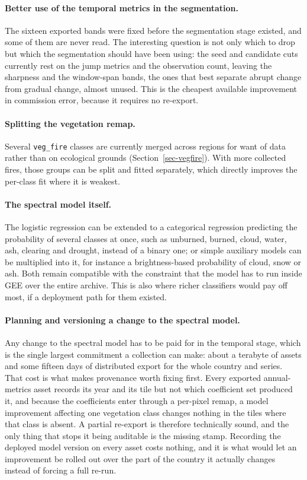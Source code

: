 \documentclass[11pt,a4paper]{article}
\begin{document}
\paragraph{Better use of the temporal metrics in the segmentation.} The sixteen exported bands were
fixed before the segmentation stage existed, and some of them are never read. The interesting
question is not only which to drop but which the segmentation should have been using: the seed and
candidate cuts currently rest on the jump metrics and the observation count, leaving the sharpness
and the window-span bands, the ones that best separate abrupt change from gradual change, almost
unused. This is the cheapest available improvement in commission error, because it requires no
re-export.

\paragraph{Splitting the vegetation remap.} Several \texttt{veg\_fire} classes are currently merged
across regions for want of data rather than on ecological grounds (Section~\ref{sec-vegfire}). With
more collected fires, those groups can be split and fitted separately, which directly
improves the per-class fit where it is weakest.

\paragraph{The spectral model itself.} The logistic regression can be extended to a categorical
regression predicting the probability of several classes at once, such as unburned, burned, cloud,
water, ash, clearing and drought, instead of a binary one; or simple auxiliary models can be
multiplied into it, for instance a brightness-based probability of cloud, snow or ash. Both remain
compatible with the constraint that the model has to run inside GEE over the entire archive. This
is also where richer classifiers would pay off most, if a deployment path for them existed.

\paragraph{Planning and versioning a change to the spectral model.} Any change to the spectral
model has to be paid for in the temporal stage, which is the single largest commitment a collection
can make: about a terabyte of assets and some fifteen days of distributed export for the whole
country and series. That cost is what makes provenance worth fixing first. Every exported
annual-metrics asset records its year and its tile but not which coefficient set produced it, and
because the coefficients enter through a per-pixel remap, a model improvement affecting one
vegetation class changes nothing in the tiles where that class is absent. A partial re-export is
therefore technically sound, and the only thing that stops it being auditable is the missing stamp.
Recording the deployed model version on every asset costs nothing, and it is what would let an
improvement be rolled out over the part of the country it actually changes instead of forcing a
full re-run.

\newpage

\printbibliography
\end{document}
